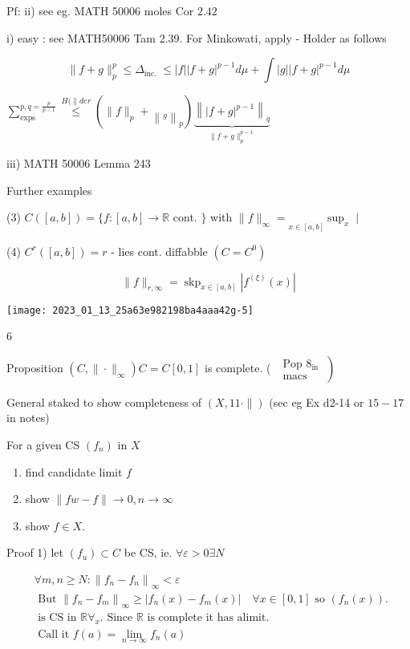 \documentclass[10pt]{article}
\begin{document}
Pf: ii) see eg. MATH 50006 moles Cor $2.42$

i) easy : see MATH50006 Tam 2.39. For Minkowati, apply - Holder as follows

$$
\|f+g\|_{p}^{p} \leq \Delta_{\text {inc. }} \leq|f||f+g|^{p-1} d \mu+\int|g||f+g|^{p-1} d \mu
$$

$\sum_{\operatorname{exps}}^{p, q=\frac{p}{p-1}} \stackrel{H(\| d e r}{\leqslant}\left(\|f\|_{p}+\left\|_{g}\right\|_{p}\right) \underbrace{\left\||f+g|^{p-1}\right\|_{q}}_{\|f+g\|_{p}^{p-1}}$

iii) MATH 50006 Lemma 243

Further examples

(3) $C([a, b])=\{f:[a, b] \rightarrow \mathbb{R}$ cont. $\}$ with $\|f\|_{\infty}=\underset{x \in[a, b]}{ } \sup _{x} \mid$

(4) $C^{r}([a, b])=r$ - lies cont. diffabble $\left(C=C^{0}\right)$

$$
\|f\|_{r, \infty}=\operatorname{skp}_{x \in[a, b]}\left|f^{(\xi)}(x)\right|
$$

\begin{center}
\texttt{[image: 2023\_01\_13\_25a63e982198ba4aaa42g-5]}
\end{center}

6

Proposition $\left(C,\|\cdot\|_{\infty}\right) C=C[0,1]$ is complete. ( $\left.\begin{array}{c}\text { Pop } 8_{\text {in }} \\ \text { macs }\end{array}\right)$

General staked to show completeness of $(X, 11 \cdot \|)$ (sec eg Ex d2-14 or $15-17$ in notes)

For a given CS $\left(f_{n}\right)$ in $X$

\begin{enumerate}
  \item find candidate limit $f$

  \item show $\|f w-f\| \rightarrow 0, n \rightarrow \infty$

  \item show $f \in X$.

\end{enumerate}

Proof 1) let $\left(f_{u}\right) \subset C$ be CS, ie. $\forall \varepsilon>0 \exists N$

$$
\begin{aligned}
& \forall m, n \geqslant N:\left\|f_{n}-f_{n}\right\|_{\infty}<\varepsilon \\
& \text { But }\left\|f_{n}-f_{m}\right\|_{\infty} \geqslant\left|f_{n}(x)-f_{m}(x)\right| \quad \forall x \in[0,1] \text { so }\left(f_{n}(x)\right) \text {. } \\
& \text { is CS in } \mathbb{R} \forall_{x} \text {. Since } \mathbb{R} \text { is complete it has alimit. } \\
& \text { Call it } f(a)=\lim _{n \rightarrow \infty} f_{n}(a)
\end{aligned}
$$
\end{document}
